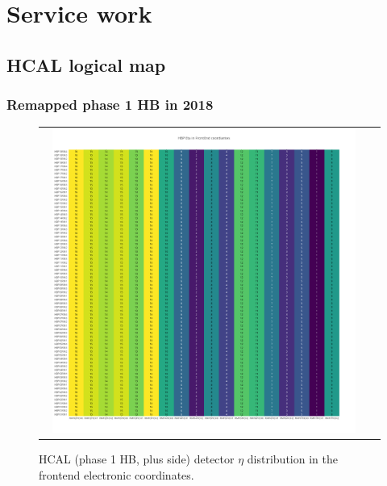 \chapter{Service work}
\clearpage

\section{HCAL logical map}
\subsection{Remapped phase 1 HB in 2018}
\clearpage

\begin{figure}[htb]
 \begin{center}
  \begin{tabular}{cc}
   \includegraphics[angle=0,width=0.95\textwidth]{figures/appendix/HBP_Eta_in_FrontEnd.png}
  \end{tabular}
	\caption{HCAL (phase 1 HB, plus side) detector $\eta$ distribution in the frontend electronic coordinates.}
  \label{fig:lmapHBPEtaFEC}
 \end{center}
\end{figure}
\clearpage


